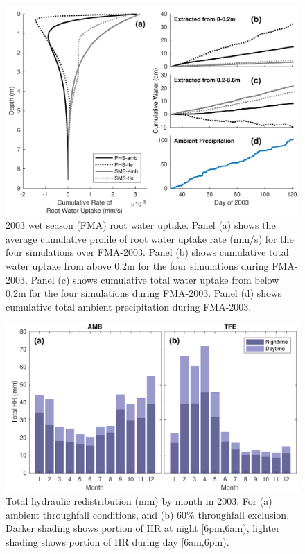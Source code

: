 \documentclass[draft,linenumbers]{agujournal}
\begin{document}
        \clearpage
    \begin{figure}[h]
     \centering
     \includegraphics[width=30pc]{../figs2/fig8.pdf}
     \caption{2003 wet season (FMA) root water uptake. 
     Panel (a) shows the average cumulative profile of root water uptake rate (mm/s) for the four simulations over FMA-2003.
     Panel (b) shows cumulative total water uptake from above 0.2m for the four simulations during FMA-2003.
     Panel (c) shows cumulative total water uptake from below 0.2m for the four simulations during FMA-2003. 
     Panel (d) shows cumulative total ambient precipitation during FMA-2003. 
     }
     \label{fig8}
  \end{figure}
  
    \clearpage
    \begin{figure}[h]
     \centering
     \includegraphics[width=30pc]{../figs2/fig9.pdf}
     \caption{Total hydraulic redistribution (mm) by month in 2003. For (a) ambient throughfall conditions, and (b) 60\% throughfall exclusion. 
     Darker shading shows portion of HR at night [6pm,6am), lighter shading shows portion of HR during day [6am,6pm).}
     \label{fig:hr}
  \end{figure}
\end{document}
